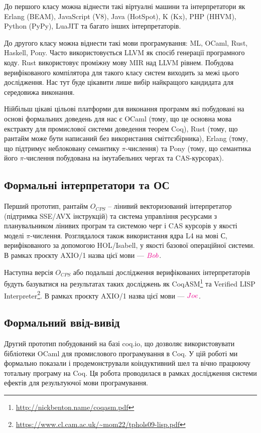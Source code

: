 До першого класу можна віднести такі віртуалні машини та інтерпретатори як
Erlang (BEAM), JavaScript (V8), Java (HotSpot), K (Kx), PHP (HHVM), Python (PyPy), LuaJIT
та багато інших інтерпретаторів.

До другого класу можна віднести такі мови програмування: ML, OCaml, Rust,
Haskell, Pony. Часто використовується LLVM як спосіб генерації програмного коду.
Rust використовує проміжну мову MIR над LLVM рівнем. Побудова верифікованого компілятора
для такого класу систем виходить за межі цього дослідження. Нас тут буде цікавити
лише вибір найкращого кандидата для середовижа виконання.

Нійбільш цікаві цільові платформи для виконання программ
які побудовані на основі формальних доведень для нас є OCaml (тому,
що це основна мова екстракту для промислової системи доведення теорем Coq),
Rust (тому, що рантайм може бути написаний без використання сміттєзбірника),
Erlang (тому, що підтримує неблоковану семантику $\pi$-числення)
та Pony (тому, що семантика його $\pi$-числення побудована на
імутабельних чергах та CAS-курсорах).

\subsection{Формальні інтерпретатори та ОС}
Перший прототип, рантайм $O_{CPS}$ -- лінивий
векторизований інтерпретатор (підтримка SSE/AVX інструкцій) та система
управління ресурсами з планувальником лінивих програм
та системою черг і CAS курсорів у якості моделі $\pi$-числення. Розглядалося також
використання ядра L4 на мові С, верифікованого за допомогою HOL/Isabell,
у якості базової операційної системи. В рамках проєкту AXIO/1
назва цієї мови --- $\textcolor{magenta}{Bob}$.

Наступна версія $O_{CPS}$ або подальші дослідження верифікованих інтерпретаторів
будуть базуватися на результатах таких досліджень як
CoqASM\footnote{\url{http://nickbenton.name/coqasm.pdf}} та
Verified LISP Interpreter\footnote{\url{https://www.cl.cam.ac.uk/~mom22/tphols09-lisp.pdf}}.
В рамках проєкту AXIO/1
назва цієї мови --- $\textcolor{magenta}{Joe}$.

\subsection{Формальний ввід-вивід}
Другий прототип побудований на базі coq.io, що дозволяє
використовувати бібліотеки OCaml для промислового програмування в Coq.
У цій роботі ми формально показали і продемонстрували коіндуктивний шел
та вічно працюючу тотальну програму на Coq. Ця робота проводилася
в рамках дослідження системи ефектів для результуючої мови програмування.


